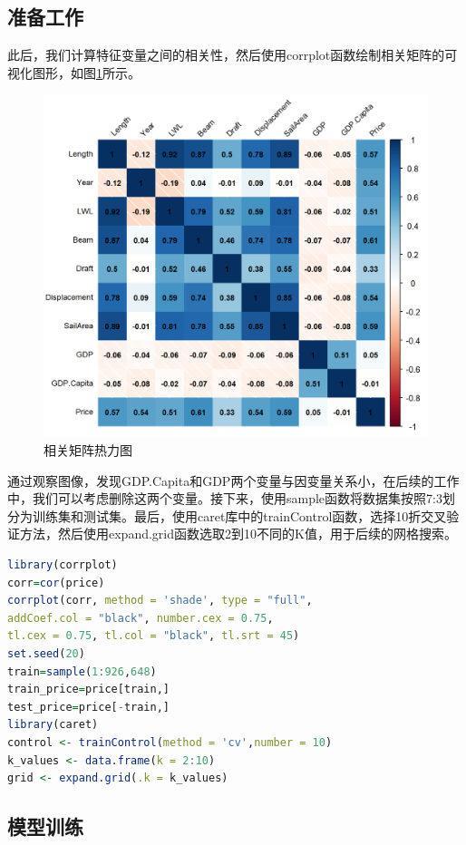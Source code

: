 \documentclass[a4paper,12pt,onecolumn,oneside]{article}
\begin{document}
	\subsection{准备工作}
	此后，我们计算特征变量之间的相关性，然后使用corrplot函数绘制相关矩阵的可视化图形，如图\ref{fig:corrplot}所示。\par 
	\begin{figure}[h]
		\centering
		\includegraphics[width=\textwidth]{res/corrplot.png}
		\caption{相关矩阵热力图}
		\label{fig:corrplot}
	\end{figure}
	通过观察图像，发现GDP.Capita和GDP两个变量与因变量关系小，在后续的工作中，我们可以考虑删除这两个变量。接下来，使用sample函数将数据集按照7:3划分为训练集和测试集。最后，使用caret库中的trainControl函数，选择10折交叉验证方法，然后使用expand.grid函数选取2到10不同的K值，用于后续的网格搜索。
	
	\begin{lstlisting}[language=R, caption={准备工作}, label={lst:2},belowcaptionskip=0.5\baselineskip]
library(corrplot)
corr=cor(price)
corrplot(corr, method = 'shade', type = "full",
addCoef.col = "black", number.cex = 0.75,
tl.cex = 0.75, tl.col = "black", tl.srt = 45)
set.seed(20)
train=sample(1:926,648) 
train_price=price[train,]
test_price=price[-train,]
library(caret)
control <- trainControl(method = 'cv',number = 10)
k_values <- data.frame(k = 2:10)
grid <- expand.grid(.k = k_values)
	\end{lstlisting}
	\subsection{模型训练}  %
\end{document}
